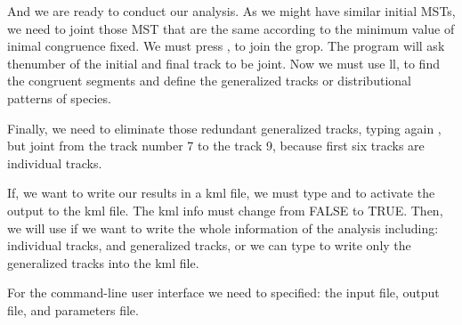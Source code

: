 And we are ready to conduct our analysis. As we might have similar initial MSTs, we need to joint those MST that are the same according to the minimum value of inimal congruence fixed. We must press , to join the grop. The program will ask thenumber of the initial and final track to be joint. Now we must use  ll, to find the congruent segments and define  the generalized tracks or distributional patterns of species. 

Finally, we need to eliminate those redundant generalized tracks, typing again , but joint from the track number 7  to the track 9, because first six tracks are individual tracks.

If, we want to write our results  in a kml file, we must type  and \tui{+} to activate the output to the  kml file. The kml info must change from FALSE to TRUE. Then, we will use  if we want to write the whole information of the analysis including: individual tracks, and generalized tracks, or we can type  to write only the generalized tracks into the kml file.


For the command-line user interface we need to specified: the input file, output file, and parameters file.



